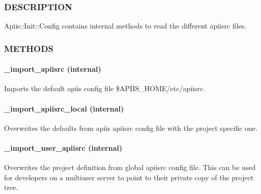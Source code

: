 \subsubsection*{DESCRIPTION\label{Apiis::Init::Config_mainly_ready_apiisrc_config_files_DESCRIPTION}}


Apiis::Init::Config contains internal methods to read the different apiisrc
files.

\subsubsection*{METHODS\label{Apiis::Init::Config_mainly_ready_apiisrc_config_files_METHODS}}
\paragraph*{\_import\_apiisrc (internal)\label{Apiis::Init::Config_mainly_ready_apiisrc_config_files__import_apiisrc_internal_}}


Imports the default apiis config file \$APIIS\_HOME/etc/apiisrc.

\paragraph*{\_import\_apiisrc\_local (internal)\label{Apiis::Init::Config_mainly_ready_apiisrc_config_files__import_apiisrc_local_internal_}}


Overwrites the defaults from apiis apiisrc config file with the
project specific one.

\paragraph*{\_import\_user\_apiisrc (internal)\label{Apiis::Init::Config_mainly_ready_apiisrc_config_files__import_user_apiisrc_internal_}}


Overwrites the project definition from global apiisrc config file.
This can be used for developers on a multiuser server to point to their
private copy of the project tree.



